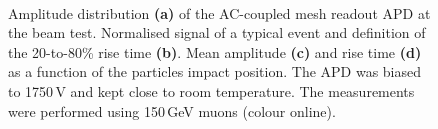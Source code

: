 \documentclass[review,number,sort&compress]{elsarticle}
\begin{document}
\begin{figure}[h]
  \centering
  \hfill
  \\
  \hfill
  \caption{Amplitude distribution \textbf{(a)} of the AC-coupled mesh readout APD at the beam test. Normalised signal of a typical event and definition of the 20-to-80\% rise time \textbf{(b)}. Mean amplitude \textbf{(c)} and rise time \textbf{(d)} as a function of the particles impact position. The APD was biased to 1750\,V and kept close to room temperature. The measurements were performed using 150\,GeV muons (colour online).}
  \label{fig:uniformityRiseTimeAmpliTB}
\end{figure}
\end{document}
